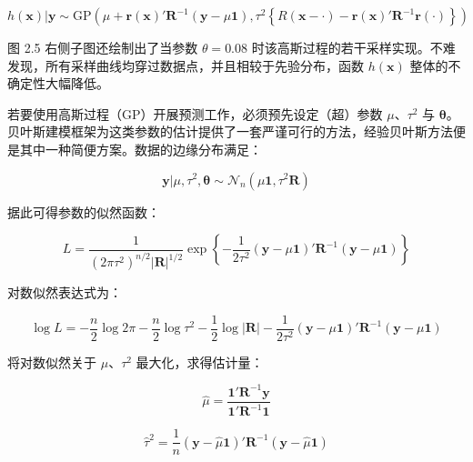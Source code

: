 \documentclass{ctexart}
\begin{document}
\begin{equation*}
h(\boldsymbol{x})|\boldsymbol{y}\sim\mathrm{GP}\left(\mu+\boldsymbol{r}(\boldsymbol{x})'\boldsymbol{R}^{-1}(\boldsymbol{y}-\mu\boldsymbol{1}),\tau^2\left\{R(\boldsymbol{x}-\cdot)-\boldsymbol{r}(\boldsymbol{x})'\boldsymbol{R}^{-1}\boldsymbol{r}(\cdot)\right\}\right)
\tag{2.19}
\end{equation*}

图 2.5 右侧子图还绘制出了当参数 $\theta=0.08$ 时该高斯过程的若干采样实现。不难发现，所有采样曲线均穿过数据点，并且相较于先验分布，函数 $h(\boldsymbol{x})$ 整体的不确定性大幅降低。

若要使用高斯过程（GP）开展预测工作，必须预先设定（超）参数 $\mu$、$\tau^2$ 与 $\boldsymbol{\theta}$。贝叶斯建模框架为这类参数的估计提供了一套严谨可行的方法，经验贝叶斯方法便是其中一种简便方案。数据的边缘分布满足：

\begin{equation*}
\boldsymbol{y}|\mu,\tau^{2},\boldsymbol{\theta}\sim\mathcal{N}_{n}(\mu\boldsymbol{1},\tau^{2}\boldsymbol{R})
\end{equation*}

据此可得参数的似然函数：

\begin{equation*}
L=\frac{1}{(2\pi\tau^{2})^{n/2}|\boldsymbol{R}|^{1/2}}\exp\left\{-\frac{1}{2\tau^{2}}(\boldsymbol{y}-\mu\boldsymbol{1})'\boldsymbol{R}^{-1}(\boldsymbol{y}-\mu\boldsymbol{1})\right\}
\end{equation*}

对数似然表达式为：

\begin{equation*}
\log L=-\frac{n}{2}\log 2\pi-\frac{n}{2}\log\tau^2-\frac{1}{2}\log|\boldsymbol{R}|-\frac{1}{2\tau^2}(\boldsymbol{y}-\mu\boldsymbol{1})'\boldsymbol{R}^{-1}(\boldsymbol{y}-\mu\boldsymbol{1})
\end{equation*}

将对数似然关于 $\mu$、$\tau^2$ 最大化，求得估计量：

\begin{equation*}
\widehat{\mu}=\frac{\boldsymbol{1}'\boldsymbol{R}^{-1}\boldsymbol{y}}{\boldsymbol{1}'\boldsymbol{R}^{-1}\boldsymbol{1}}\tag{2.20}
\end{equation*}

\begin{equation*}
\widehat{\tau}^2=\frac{1}{n}(\boldsymbol{y}-\widehat{\mu}\boldsymbol{1})'\boldsymbol{R}^{-1}(\boldsymbol{y}-\widehat{\mu}\boldsymbol{1})\tag{2.21}
\end{equation*}
\end{document}
